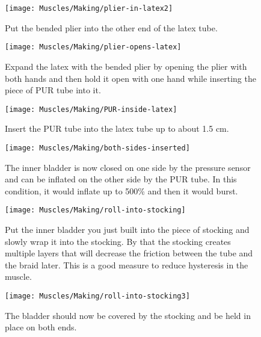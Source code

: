 \documentclass[main]{subfiles}
\begin{document}
\begin{figure}[H]
\centering
\texttt{[image: Muscles/Making/plier-in-latex2]}
\caption[Plier with latex tube and pressure sensor]{Put the bended plier into the other end of the latex tube.}
\label{plier-in-latex2}
\end{figure}

\begin{figure}[H]
\centering
\texttt{[image: Muscles/Making/plier-opens-latex]}
\caption[Expanded latex tube]{Expand the latex with the bended plier by opening the plier with both hands and then hold it open with one hand while inserting the piece of PUR tube into it.}
\label{plier-opens-latex}
\end{figure}

\begin{figure}[H]
\centering
\texttt{[image: Muscles/Making/PUR-inside-latex]}
\caption[PUR tube inserted into latex]{Insert the PUR tube into the latex tube up to about 1.5 cm.}
\label{PUR-inside-latex}
\end{figure}

\begin{figure}[H]
\centering
\texttt{[image: Muscles/Making/both-sides-inserted]}
\caption[Closed inner bladder]{The inner bladder is now closed on one side by the pressure sensor and can be inflated on the other side by the PUR tube. In this condition, it would inflate up to 500\% and then it would burst.}
\label{both-sides-inserted}
\end{figure}

\begin{figure}[H]
\centering
\texttt{[image: Muscles/Making/roll-into-stocking]}
\caption[Wrapping the bladder into the stocking]{Put the inner bladder you just built into the piece of stocking and slowly wrap it into the stocking. By that the stocking creates multiple layers that will decrease the friction between the tube and the braid later. This is a good measure to reduce hysteresis in the muscle.}
\label{roll-into-stocking}
\end{figure}

\begin{figure}[H]
\centering
\texttt{[image: Muscles/Making/roll-into-stocking3]}
\caption[Completely wrapped bladder]{The bladder should now be covered by the stocking and be held in place on both ends.}
\label{roll-into-stocking3}
\end{figure}
\end{document}
